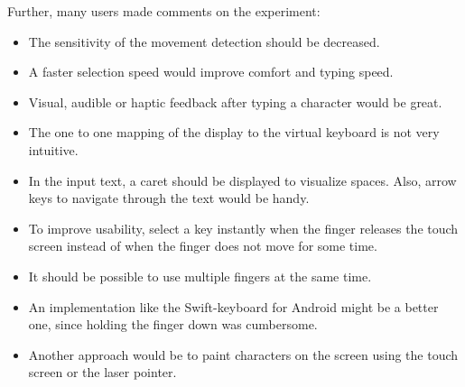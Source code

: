 Further, many users made comments on the experiment:
\begin{itemize}
	\item The sensitivity of the movement detection should be decreased.
	\item A faster selection speed would improve comfort and typing speed.
	\item Visual, audible or haptic feedback after typing a character would be great.
	\item The one to one mapping of the display to the virtual keyboard is not very intuitive.
	\item In the input text, a caret should be displayed to visualize spaces. Also, arrow keys to navigate through the text would be handy.
	\item To improve usability, select a key instantly when the finger releases the touch screen instead of when the finger does not move for some time.
	\item It should be possible to use multiple fingers at the same time.
	\item An implementation like the Swift-keyboard for Android might be a better one, since holding the finger down was cumbersome.
	\item Another approach would be to paint characters on the screen using the touch screen or the laser pointer.
\end{itemize}
